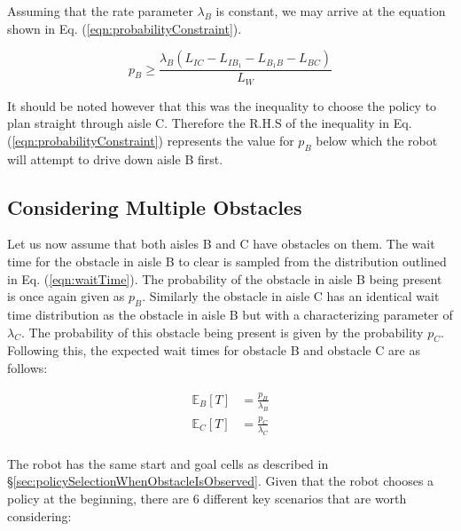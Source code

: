 \documentclass[a4paper,12pt]{article}
\begin{document}
			Assuming that the rate parameter $\lambda_B$ is constant, we may arrive at the equation shown in Eq. (\ref{eqn:probabilityConstraint}).
			
			\begin{equation}
				p_B \geq \frac{\lambda_B\left(L_{IC}-L_{IB_1}-L_{B_1B}-L_{BC}\right)}{L_W}
			\label{eqn:probabilityConstraint}
			\end{equation}
		
			It should be noted however that this was the inequality to choose the policy to plan straight through aisle C. Therefore the R.H.S of the inequality in Eq. (\ref{eqn:probabilityConstraint}) represents the value for $p_B$ below which the robot will attempt to drive down aisle B first. 
		
		\subsection{Considering Multiple Obstacles}
		
			Let us now assume that both aisles B and C have obstacles on them. The wait time for the obstacle in aisle B to clear is sampled from the distribution outlined in Eq. (\ref{eqn:waitTime}). The probability of the obstacle in aisle B being present is once again given as $p_B$. Similarly the obstacle in aisle C has an identical wait time distribution as the obstacle in aisle B but with a characterizing parameter of $\lambda_C$. The probability of this obstacle being present is given by the probability $p_C$. Following this, the expected wait times for obstacle B and obstacle C are as follows:
			
			\begin{equation}
			\begin{split}
				\mathbb{E}_{B}[T] &= \frac{p_B}{\lambda_B} \\
				\mathbb{E}_{C}[T] &= \frac{p_C}{\lambda_C} \\
			\end{split}
			\label{eqn:expectedWaitTimeBC}
			\end{equation}
			
			The robot has the same start and goal cells as described in \S \ref{sec:policySelectionWhenObstacleIsObserved}. Given that the robot chooses a policy at the beginning, there are 6 different key scenarios that are worth considering:
			
\end{document}
